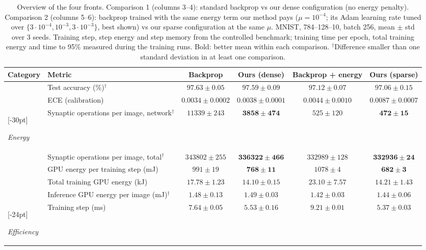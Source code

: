 \documentclass{article}
\begin{document}
\begin{table}[H]
\centering
\small
\setlength{\tabcolsep}{4pt}
\caption{Overview of the four fronts. Comparison 1 (columns 3--4): standard backprop vs our dense configuration (no energy penalty). Comparison 2 (columns 5--6): backprop trained with the same energy term our method pays ($\mu = 10^{-4}$; its Adam learning rate tuned over $\{3\cdot10^{-4}, 10^{-3}, 3\cdot10^{-3}\}$, best shown) vs our sparse configuration at the same $\mu$. MNIST, 784--128--10, batch 256, mean $\pm$ std over 3 seeds. Training step, step energy and step memory from the controlled benchmark; training time per epoch, total training energy and time to 95\% measured during the training runs. Bold: better mean within each comparison. $^\dagger$Difference smaller than one standard deviation in at least one comparison.}
\label{tab:overview}
\begin{tabular}{>{\raggedright\arraybackslash}p{2.1cm}>{\raggedright\arraybackslash}p{3.5cm}cccc}
\toprule
Category & Metric & Backprop & Ours (dense) & Backprop + energy & Ours (sparse) \\
\midrule
\multirow{2}{*}{\parbox[c]{2.1cm}{\raggedright\textit{Accuracy}}} & Test accuracy (\%)$^\dagger$ & $\boldsymbol{97.63 \pm 0.05}$ & $97.59 \pm 0.09$ & $\boldsymbol{97.12 \pm 0.07}$ & $97.06 \pm 0.15$ \\
 & ECE (calibration) & $\boldsymbol{0.0034 \pm 0.0002}$ & $0.0038 \pm 0.0001$ & $\boldsymbol{0.0044 \pm 0.0010}$ & $0.0087 \pm 0.0007$ \\
\midrule
\multirow{5}{*}[-30pt]{\parbox[c]{2.1cm}{\raggedright\textit{Energy}}} & Synaptic operations per image, network$^\dagger$ & $11339 \pm 243$ & $\boldsymbol{3858 \pm 474}$ & $525 \pm 120$ & $\boldsymbol{472 \pm 15}$ \\
 & Synaptic operations per image, total$^\dagger$ & $343802 \pm 255$ & $\boldsymbol{336322 \pm 466}$ & $332989 \pm 128$ & $\boldsymbol{332936 \pm 24}$ \\
 & GPU energy per training step (mJ) & $991 \pm 19$ & $\boldsymbol{768 \pm 11}$ & $1078 \pm 4$ & $\boldsymbol{682 \pm 3}$ \\
 & Total training GPU energy (kJ) & $17.78 \pm 1.23$ & $\boldsymbol{14.10 \pm 0.15}$ & $23.10 \pm 7.57$ & $\boldsymbol{14.21 \pm 1.43}$ \\
 & Inference GPU energy per image (mJ)$^\dagger$ & $\boldsymbol{1.48 \pm 0.13}$ & $1.49 \pm 0.03$ & $\boldsymbol{1.42 \pm 0.03}$ & $1.44 \pm 0.06$ \\
\midrule
\multirow{5}{*}[-24pt]{\parbox[c]{2.1cm}{\raggedright\textit{Efficiency}}} & Training step (ms) & $7.64 \pm 0.05$ & $\boldsymbol{5.53 \pm 0.16}$ & $9.21 \pm 0.01$ & $\boldsymbol{5.37 \pm 0.03}$ \\

\end{tabular}
\end{table}
\end{document}
